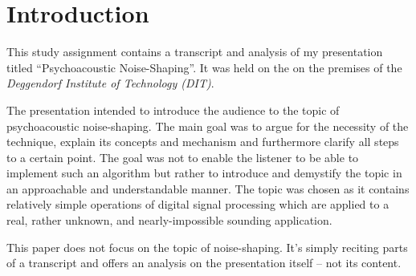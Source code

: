\chapter{Introduction}


This study assignment contains a transcript and analysis of my presentation titled \enquote{Psychoacoustic Noise-Shaping}.
It was held on the  on the premises of the \textit{Deggendorf Institute of Technology (DIT)}.

The presentation intended to introduce the audience to the topic of psychoacoustic noise-shaping.
The main goal was to argue for the necessity of the technique, explain its concepts and mechanism and furthermore clarify all steps to a certain point.
The goal was not to enable the listener to be able to implement such an algorithm but rather to introduce and demystify the topic in an approachable and understandable manner.
The topic was chosen as it contains relatively simple operations of digital signal processing which are applied to a real, rather unknown, and nearly-impossible sounding application.

This paper does not focus on the topic of noise-shaping.
It's simply reciting parts of a transcript and offers an analysis on the presentation itself -- not its content.
